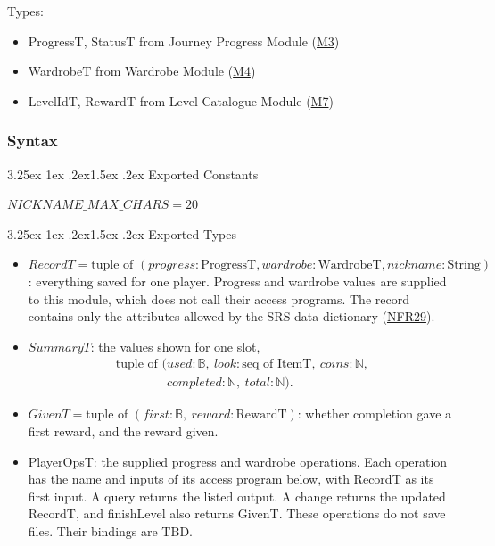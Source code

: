 \documentclass[10pt, titlepage]{article}
\makeatletter
\newcommand{\srsurl}{https://team-hindsight.github.io/ophthamology-game/SRS/SRS.pdf}
\newcommand{\srsitemref}[2]{\href{\srsurl\#nameddest=#1}{#2}}
\newcommand{\misref}[2]{\hyperref[mis:#1]{M#2}}
\renewcommand\paragraph{\@startsection{paragraph}{4}{\z@}%
  {3.25ex \@plus 1ex \@minus .2ex}{1.5ex \@plus .2ex}%
  {\normalfont\normalsize\bfseries}}
\newcommand{\B}{\mathbb{B}}
\newcommand{\N}{\mathbb{N}}
\newcommand{\T}[1]{\mathit{#1}}          %
\makeatother
\begin{document}
Types:
\begin{itemize}
\item ProgressT, StatusT from Journey Progress Module (\misref{Progress}{3})
\item WardrobeT from Wardrobe Module (\misref{Wardrobe}{4})
\item LevelIdT, RewardT from Level Catalogue Module (\misref{Levels}{7})
\end{itemize}

\subsubsection{Syntax}

\paragraph{Exported Constants}

$\T{NICKNAME\_MAX\_CHARS} = 20$

\paragraph{Exported Types}

\begin{itemize}
\item $\T{RecordT} = \text{tuple of } (\T{progress} : \text{ProgressT},
  \T{wardrobe} : \text{WardrobeT}, \T{nickname} : \text{String})$:
  everything saved for one player. Progress and wardrobe values are
  supplied to this module, which does not call their access programs.
  The record contains only the attributes allowed by the SRS data
  dictionary (\srsitemref{NFR_Minimization}{NFR29}).
\item $\T{SummaryT}$: the values shown for one slot,
  \[\begin{array}{l}
  \text{tuple of } (\T{used} : \B,\ \T{look} : \text{seq of ItemT},\
  \T{coins} : \N,\\
  \phantom{\text{tuple of } (}\T{completed} : \N,\ \T{total} : \N).
  \end{array}\]
\item $\T{GivenT} = \text{tuple of } (\T{first} : \B,\
  \T{reward} : \text{RewardT})$: whether completion gave a first reward,
  and the reward given.
\item PlayerOpsT: the supplied progress and wardrobe operations. Each
  operation has the name and inputs of its access program below, with
  RecordT as its first input. A query returns the listed output. A
  change returns the updated RecordT, and finishLevel also returns GivenT.
  These operations do not save files. Their bindings are TBD.
\end{itemize}
\end{document}
